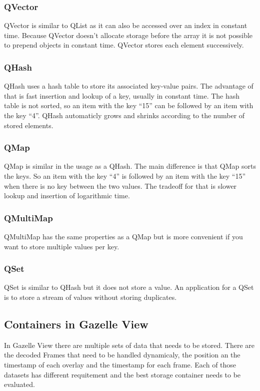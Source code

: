 \subsubsection{QVector}
\label{sec:QVector}
QVector is similar to QList as it can also be accessed over an index in constant time. Because QVector doesn't allocate storage before the array it is not possible to prepend objects in constant time. QVector stores each element successively.
\subsubsection{QHash}
\label{sec:QHash}
QHash uses a hash table to store its associated key-value pairs. The advantage of that is fast insertion and lookup of a key, usually in constant time. The hash table is not sorted, so an item with the key ``15'' can be followed by an item with the key ``4''. QHash automaticly grows and shrinks according to the number of stored elements. 
\subsubsection{QMap}
\label{sec:QMap}
QMap is similar in the usage as a QHash. The main difference is that QMap sorts the keys. So an item with the key ``4'' is followed by an item with the key ``15'' when there is no key between the two values. The tradeoff for that is slower lookup and insertion of logarithmic time.
\subsubsection{QMultiMap}
\label{sec:QMultiMap}
QMultiMap has the same properties as a QMap but is more convenient if you want to store multiple values per key.
\subsubsection{QSet}
\label{sec:QSet}
QSet is similar to QHash but it does not store a value. An application for a QSet is to store a stream of values without storing duplicates.
\subsection{Containers in Gazelle View}
\label{sec:containersGazelleView}
In Gazelle View there are multiple sets of data that needs to be stored. There are the decoded Frames that need to be handled dynamicaly, the position an the timestamp of each overlay and the timestamp for each frame. Each of those datasets has different requitement and the best storage container needs to be evaluated.
